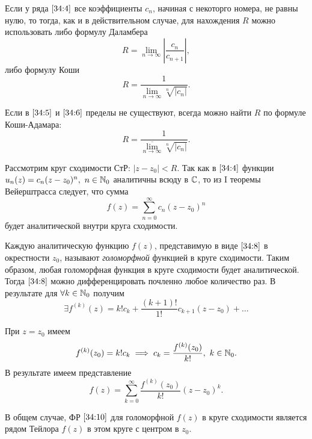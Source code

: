 \documentclass[../../main.tex]{subfiles}
\begin{document}
Если у ряда $ \eqref{34:4} $ все коэффициенты $ c_n $, начиная с некоторго 
номера, не равны нулю, то тогда, как и в действительном случае, для 
нахождения $R$ можно использовать либо формулу Даламбера
\begin{equation}\label{34:5}
	R = \underset{n \to \infty}{\lim} \left|\frac{c_n}{c_{n+1}}\right|,
\end{equation}
либо формулу Коши
\begin{equation}\label{34:6}
	R = \frac{1}{\underset{n \to \infty}{\lim} \sqrt[n]{|c_n|}}.
\end{equation}

Если в $ \eqref{34:5} $ и $ \eqref{34:6} $ пределы не существуют, всегда можно 
найти $R$ по формуле Коши-Адамара:
\begin{equation}\label{34:7}
	R = \frac{1}{\overline{\underset{n \to \infty}{\lim}} \sqrt[n]{|c_n|}}.
\end{equation}

Рассмотрим круг сходимости СтР: $ |z - z_0| < R $. Так как в $ \eqref{34:4} $ функции $ 
u_n(z) = c_n(z - z_0)^n,\ n \in \mathbb{N}_0 $ аналитичны всюду в $ \mathbb{C} $, то из I 
теоремы Вейерштрасса следует, что сумма
\begin{equation}\label{34:8}
	f(z) = \sum\limits_{n = 0}^{\infty} c_n(z - z_0)^n
\end{equation}
будет аналитической внутри круга сходимости.

Каждую аналитическую функцию $ f(z) $, представимую в виде $ \eqref{34:8} $ в 
окрестности $z_0$, называют \emph{голоморфной} функцией в круге сходимости.
Таким образом, любая голоморфная функция в круге сходимости будет аналитической.
Тогда $ \eqref{34:8} $ можно дифференцировать почленно любое количество раз. В 
результате для $ \forall k \in \mathbb{N}_0 $ получим
\[ \exists f^{(k)}(z) = k!c_k + \frac{(k + 1)!}{1!}c_{k + 1}(z - z_0) + 
\ldots \]

При $ z = z_0 $ имеем
\begin{equation}\label{34:9}
	f^{(k)}(z_0) = k!c_k \implies c_k = \frac{f^{(k)}(z_0)}{k!},\ k \in \mathbb{N}_0.
\end{equation}
В результате имеем представление
\begin{equation}\label{34:10}
	f(z) = \sum\limits_{k = 0}^{\infty} \frac{f^{(k)}(z_0)}{k!}(z - z_0)^k.
\end{equation}

В общем случае, ФР $ \eqref{34:10} $ для голоморфной $ f(z) $ в круге 
сходимости является рядом Тейлора $ f(z) $ в этом круге с центром в $ z_0 $.
\end{document}

